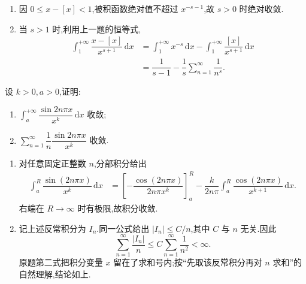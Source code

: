 \begin{solution}
    \leavevmode
    \begin{enumerate}
        \item 因 $0\leq x-[x]<1$,被积函数绝对值不超过 $x^{-s-1}$,故 $s>0$ 时绝对收敛.
        \item 当 $s>1$ 时,利用上一题的恒等式,
              \[
                  \begin{aligned}
                      \int_1^{+\infty}\dfrac{x-[x]}{x^{s+1}}\,\mathrm{d}x
                       & =\int_1^{+\infty}x^{-s}\,\mathrm{d}x
                      -\int_1^{+\infty}\dfrac{[x]}{x^{s+1}}\,\mathrm{d}x                       \\
                       & =\dfrac{1}{s-1}-\dfrac{1}{s}\sum\limits_{n=1}^{\infty}\dfrac{1}{n^s}.
                  \end{aligned}
              \]
    \end{enumerate}
\end{solution}

\begin{example}
    设 $k>0,a>0$,证明:
    \begin{enumerate}
        \item $\displaystyle\int_a^{+\infty}\dfrac{\sin2n\pi x}{x^k}\,\mathrm{d}x$ 收敛;
        \item $\displaystyle\sum\limits_{n=1}^{\infty}\dfrac{1}{n}\dfrac{\sin2n\pi x}{x^k}$ 收敛.
    \end{enumerate}
\end{example}
\exampleblank

\begin{solution}
    \leavevmode
    \begin{enumerate}
        \item 对任意固定正整数 $n$,分部积分给出
              \[
                  \begin{aligned}
                      \int_a^R\dfrac{\sin(2n\pi x)}{x^k}\,\mathrm{d}x
                       & =\left[-\dfrac{\cos(2n\pi x)}{2n\pi x^k}\right]_a^R
                      -\dfrac{k}{2n\pi}\int_a^R\dfrac{\cos(2n\pi x)}{x^{k+1}}\,\mathrm{d}x.
                  \end{aligned}
              \]
              右端在 $R\to\infty$ 时有极限,故积分收敛.
        \item 记上述反常积分为 $I_n$.同一公式给出 $|I_n|\leq C/n$,其中 $C$ 与 $n$ 无关.因此
              \[
                  \displaystyle\sum\limits_{n=1}^{\infty}\dfrac{|I_n|}{n}
                  \leq C\sum\limits_{n=1}^{\infty}\dfrac{1}{n^2}<\infty.
              \]
              原题第二式把积分变量 $x$ 留在了求和号内;按``先取该反常积分再对 $n$ 求和''的自然理解,结论如上.
    \end{enumerate}
\end{solution}

